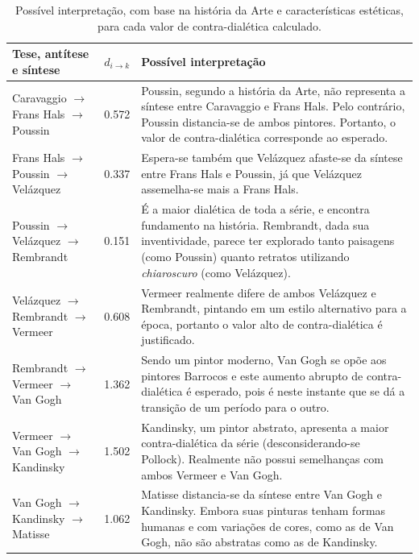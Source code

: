 \begin{longtable}{llp{8cm}}
\caption{\label{tab:interpretacaoDia} Possível interpretação, com base na história da Arte e características estéticas, para cada valor de contra-dialética calculado.}\\

\hline \hline
\textbf{Tese, antítese e síntese}       & \textbf{$d_{i \rightarrow k}$} & \textbf{Possível interpretação} \\ \hline

Caravaggio $\to$ Frans Hals $\to$ Poussin   & 0.572 &
Poussin, segundo a história da Arte, não representa a síntese entre
Caravaggio e Frans Hals. Pelo contrário, Poussin distancia-se de ambos pintores.
Portanto, o valor de contra-dialética corresponde ao esperado. \\ \hline

Frans Hals $\to$ Poussin $\to$ Velázquez & 0.337 &
Espera-se também que Velázquez afaste-se da síntese entre Frans Hals e Poussin,
já que Velázquez assemelha-se mais a Frans Hals. \\ \hline

Poussin $\to$ Velázquez $\to$ Rembrandt  & 0.151 &
É a maior dialética de toda a série, e encontra fundamento na história. Rembrandt,
dada sua inventividade, parece ter explorado tanto paisagens (como Poussin) quanto
retratos utilizando \textit{chiaroscuro} (como Velázquez). \\ \hline

Velázquez $\to$ Rembrandt $\to$ Vermeer  & 0.608 &
Vermeer realmente difere de ambos Velázquez e Rembrandt, pintando em um estilo
alternativo para a época, portanto o valor alto de contra-dialética é
justificado. \\ \hline

Rembrandt $\to$ Vermeer $\to$ Van Gogh      & 1.362 &
Sendo um pintor moderno, Van Gogh se opõe aos pintores Barrocos e este aumento abrupto
de contra-dialética é esperado, pois é neste instante que se dá a transição de
um período para o outro. \\ \hline

Vermeer $\to$ Van Gogh $\to$ Kandinsky      & 1.502 &
Kandinsky, um pintor abstrato, apresenta a maior contra-dialética da série
(desconsiderando-se Pollock). Realmente não possui semelhanças com ambos Vermeer e Van Gogh. \\ \hline

Van Gogh $\to$ Kandinsky $\to$ Matisse      & 1.062 &
Matisse distancia-se da síntese entre Van Gogh e Kandinsky. Embora suas pinturas
tenham formas humanas e com variações de cores, como as de Van Gogh, não são abstratas como as de Kandinsky. \\ \hline


\end{longtable}
